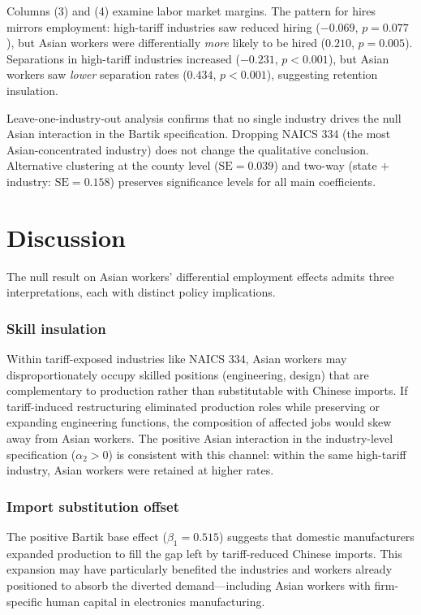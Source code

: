 \documentclass[12pt]{article}
\begin{document}
Columns (3) and (4) examine labor market margins. The pattern for hires mirrors employment: high-tariff industries saw reduced hiring ($-0.069$, $p = 0.077$), but Asian workers were differentially \textit{more} likely to be hired ($0.210$, $p = 0.005$). Separations in high-tariff industries increased ($-0.231$, $p < 0.001$), but Asian workers saw \textit{lower} separation rates ($0.434$, $p < 0.001$), suggesting retention insulation.

Leave-one-industry-out analysis confirms that no single industry drives the null Asian interaction in the Bartik specification. Dropping NAICS 334 (the most Asian-concentrated industry) does not change the qualitative conclusion. Alternative clustering at the county level ($\text{SE} = 0.039$) and two-way (state $+$ industry: $\text{SE} = 0.158$) preserves significance levels for all main coefficients.




\section{Discussion}\label{sec:discussion}

The null result on Asian workers' differential employment effects admits three interpretations, each with distinct policy implications.

\subsubsection*{Skill insulation} Within tariff-exposed industries like NAICS 334, Asian workers may disproportionately occupy skilled positions (engineering, design) that are complementary to production rather than substitutable with Chinese imports. If tariff-induced restructuring eliminated production roles while preserving or expanding engineering functions, the composition of affected jobs would skew away from Asian workers. The positive Asian interaction in the industry-level specification ($\alpha_2 > 0$) is consistent with this channel: within the same high-tariff industry, Asian workers were retained at higher rates.

\subsubsection*{Import substitution offset} The positive Bartik base effect ($\beta_1 = 0.515$) suggests that domestic manufacturers expanded production to fill the gap left by tariff-reduced Chinese imports. This expansion may have particularly benefited the industries and workers already positioned to absorb the diverted demand---including Asian workers with firm-specific human capital in electronics manufacturing.
\end{document}
